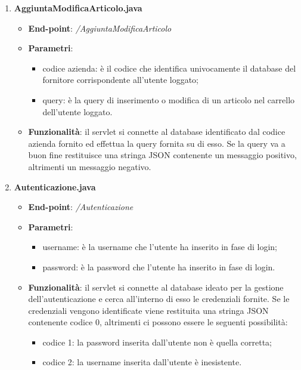 \documentclass[12pt, a4paper, titlepage]{report}
\begin{document}
	\begin{enumerate}
		\item \textbf{AggiuntaModificaArticolo.java}
		\begin{itemize}
			\item \textbf{End-point}: \textit{/AggiuntaModificaArticolo}
			\item \textbf{Parametri}:
			\begin{itemize}
				\item codice azienda: è il codice che identifica univocamente il database del fornitore corrispondente all'utente loggato;
				\item query: è la query di inserimento o modifica di un articolo nel carrello dell'utente loggato.
			\end{itemize}
			\item \textbf{Funzionalità}: il servlet si connette al database identificato dal codice azienda fornito ed effettua la query fornita su di esso. Se la query va a buon fine restituisce una stringa JSON contenente un messaggio positivo, altrimenti un messaggio negativo.
		\end{itemize}
	
		\item \textbf{Autenticazione.java}
		\begin{itemize}
			\item \textbf{End-point}: \textit{/Autenticazione}
			\item \textbf{Parametri}:
			\begin{itemize}
				\item username: è la username che l'utente ha inserito in fase di login;
				\item password: è la password che l'utente ha inserito in fase di login.
			\end{itemize}
			\item \textbf{Funzionalità}: il servlet si connette al database ideato per la gestione dell'autenticazione e cerca all'interno di esso le credenziali fornite. Se le credenziali vengono identificate viene restituita una stringa JSON contenente codice 0, altrimenti ci possono essere le seguenti possibilità:
			\begin{itemize}
				\item codice 1: la password inserita dall'utente non è quella corretta;
				\item codice 2: la username inserita dall'utente è inesistente.
			\end{itemize}
		\end{itemize}
	

\end{enumerate}
\end{document}
